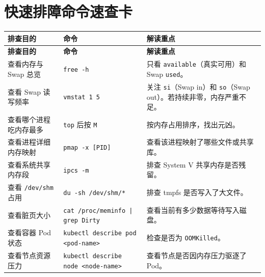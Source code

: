 \appendix
\chapter{快速排障命令速查卡}

\renewcommand{\arraystretch}{1.4}
\begin{longtable}{@{}p{4cm} p{6cm} p{5cm}@{}}
\toprule
\textbf{排查目的} & \textbf{命令} & \textbf{解读重点} \\
\midrule
\endfirsthead
\toprule
\textbf{排查目的} & \textbf{命令} & \textbf{解读重点} \\
\midrule
\endhead
查看内存与 Swap 总览 & \texttt{free -h} & 只看 \texttt{available}（真实可用）和 Swap \texttt{used}。 \\
\addlinespace
查看 Swap 读写频率 & \texttt{vmstat 1 5} & 关注 \texttt{si}（Swap in）和 \texttt{so}（Swap out）。若持续非零，内存严重不足。 \\
\addlinespace
查看哪个进程吃内存最多 & \texttt{top} 后按 \texttt{M} & 按内存占用排序，找出元凶。 \\
\addlinespace
查看进程详细内存映射 & \texttt{pmap -x [PID]} & 查看该进程映射了哪些文件或共享库。 \\
\addlinespace
查看系统共享内存段 & \texttt{ipcs -m} & 排查 System V 共享内存是否残留。 \\
\addlinespace
查看 \texttt{/dev/shm} 占用 & \texttt{du -sh /dev/shm/*} & 排查 tmpfs 是否写入了大文件。 \\
\addlinespace
查看脏页大小 & \texttt{cat /proc/meminfo | grep Dirty} & 查看当前有多少数据等待写入磁盘。 \\
\addlinespace
查看容器 Pod 状态 & \texttt{kubectl describe pod <pod-name>} & 检查是否为 \texttt{OOMKilled}。 \\
\addlinespace
查看节点资源压力 & \texttt{kubectl describe node <node-name>} & 查看节点是否因内存压力驱逐了 Pod。 \\
\bottomrule
\end{longtable}
\renewcommand{\arraystretch}{1.0}

